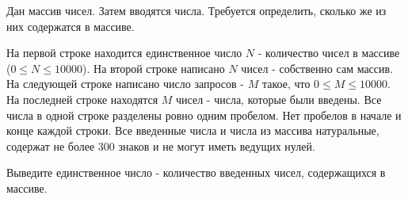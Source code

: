 Дан массив чисел. Затем вводятся числа. Требуется определить, сколько же из них содержатся в массиве.

\InputFile
На первой строке находится единственное число $N$ - количество чисел в массиве ($0 \leqslant N \leqslant 10000$).
На второй строке написано $N$ чисел - собственно сам массив.
На следующей строке написано число запросов - $M$ такое, что $0 \leqslant M \leqslant 10000$.
На последней строке находятся $M$ чисел - числа, которые были введены.
Все числа в одной строке разделены ровно одним пробелом. Нет пробелов в начале и конце каждой строки.
Все введенные числа и числа из массива натуральные, содержат не более 300 знаков и не могут иметь ведущих нулей.

\OutputFile
Выведите единственное число - количество введенных чисел, содержащихся в массиве.
